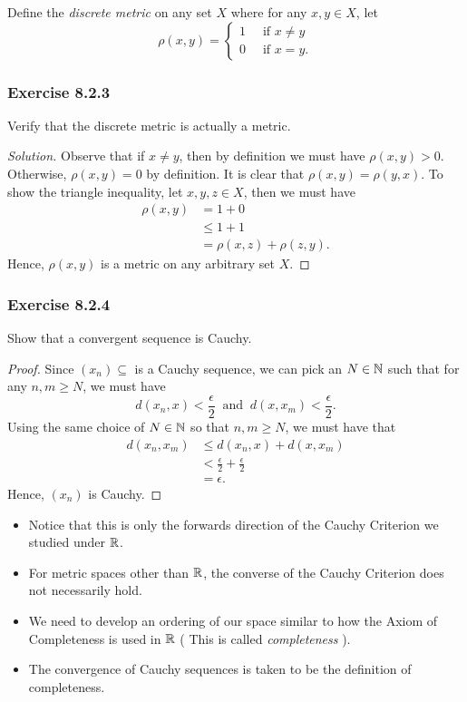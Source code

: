 Define the \textit{discrete metric} on any set \( X  \) where for any \( x, y \in X  \), let 
\[  \rho (x,y) = 
\begin{cases}
    1 \  &\text{ if } x \neq y \\
    0 \ &\text{ if } x = y.
\end{cases}  \]

\subsubsection{Exercise 8.2.3} Verify that the discrete metric is actually a metric.
\begin{proof}[Solution]
Observe that if \( x \neq y  \), then by definition we must have \( \rho(x,y) > 0  \). Otherwise, \( \rho(x,y) = 0  \) by definition. It is clear that \( \rho(x,y) = \rho(y,x) \). To show the triangle inequality, let \( x,y,z \in X  \), then we must have 
\begin{align*}
    \rho(x,y) &= 1 + 0   \\
              &\leq 1 + 1 \\
              &= \rho(x,z) + \rho(z,y). 
\end{align*}
Hence, \( \rho(x,y)  \) is a metric on any arbitrary set \(  X \).
\end{proof}

\subsubsection{Exercise 8.2.4} Show that a convergent sequence is Cauchy.
\begin{proof}
    Since \( (x_{n}) \subseteq \) is a Cauchy sequence, we can pick an \( N \in \mathbb{N}  \) such that for any \( n,m \geq N  \), we must have 
    \[  d(x_{n}, x ) < \frac{ \epsilon  }{ 2  }  \ \text{ and } \ d(x, x_{m}) < \frac{ \epsilon  }{ 2 } .\] Using the same choice of \( N \in \mathbb{N}  \) so that \( n,m \geq N  \), we must have that
    \begin{align*}
        d(x_{n}, x_{m}) &\leq d(x_{n}, x )  + d(x, x_{m})\\ 
                        &< \frac{ \epsilon  }{ 2 }  + \frac{ \epsilon  }{ 2 }  \\
                        &= \epsilon.
    \end{align*}
    Hence, \( (x_{n}) \) is Cauchy.
\end{proof}

\begin{itemize}
    \item Notice that this is only the forwards direction of the Cauchy Criterion we studied under \( \mathbb{R}  \). 
    \item For metric spaces other than \( \mathbb{R}  \), the converse of the Cauchy Criterion does not necessarily hold.
    \item We need to develop an ordering of our space similar to how the Axiom of Completeness is used in \( \mathbb{R}  \) ( This is called \textit{completeness}  ). 
    \item The convergence of Cauchy sequences is taken to be the definition of completeness.
\end{itemize}




